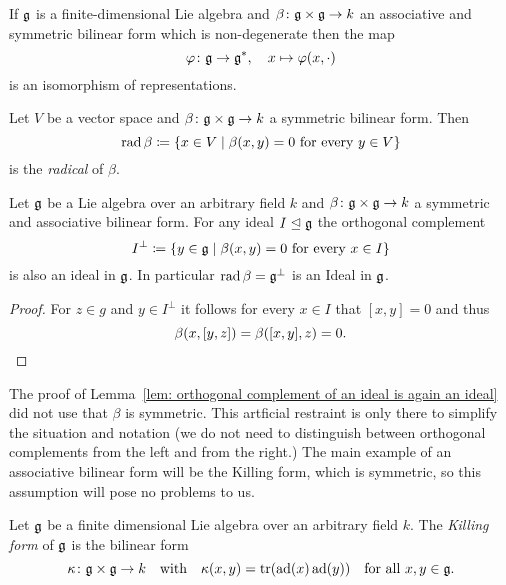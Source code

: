 \begin{cor}\label{cor: associative non-degenerate bilinear forms induce isomorphism to the dual}
 If $\mathfrak{g}$ is a finite-dimensional Lie algebra and $\beta \colon \mathfrak{g} \times \mathfrak{g} \to k$ an associative and symmetric bilinear form which is non-degenerate then the map
 \[
  \varphi \colon \mathfrak{g} \to \mathfrak{g}^*, \quad x \mapsto \varphi(x,\cdot)
 \]
 is an isomorphism of representations.
\end{cor}


\begin{defi}
 Let $V$ be a vector space and $\beta \colon \mathfrak{g} \times \mathfrak{g} \to k$ a symmetric bilinear form. Then
 \[
  \operatorname{rad} \beta \coloneqq \{x \in V \mid \text{$\beta(x,y) = 0$ for every $y \in V$}\}
 \]
 is the \emph{radical} of $\beta$.
\end{defi}


\begin{lem}\label{lem: orthogonal complement of an ideal is again an ideal}
 Let $\mathfrak{g}$ be a Lie algebra over an arbitrary field $k$ and \mbox{$\beta \colon \mathfrak{g} \times \mathfrak{g} \to k$} a symmetric and associative bilinear form. For any ideal $I \trianglelefteq \mathfrak{g}$ the orthogonal complement
 \[
  I^\perp \coloneqq \{y \in \mathfrak{g} \mid \text{$\beta(x,y) = 0$ for every $x \in I$}\}
 \]
 is also an ideal in $\mathfrak{g}$. In particular $\operatorname{rad} \beta = \mathfrak{g}^\perp$ is an Ideal in $\mathfrak{g}$.
\end{lem}
\begin{proof}
 For $z \in g$ and $y \in I^\perp$ it follows for every $x \in I$ that $[x,y] = 0$ and thus
 \[
  \beta(x,[y,z]) = \beta([x,y],z) = 0.
  \qedhere
 \]
\end{proof}


\begin{rem}
 The proof of Lemma~\ref{lem: orthogonal complement of an ideal is again an ideal} did not use that $\beta$ is symmetric. This artficial restraint is only there to simplify the situation and notation (we do not need to distinguish between orthogonal complements from the left and from the right.) The main example of an associative bilinear form will be the Killing form, which is symmetric, so this assumption will pose no problems to us.
\end{rem}


\begin{defi}
 Let $\mathfrak{g}$ be a finite dimensional Lie algebra over an arbitrary field $k$. The \emph{Killing form} of $\mathfrak{g}$ is the bilinear form
 \[
  \kappa \colon \mathfrak{g} \times \mathfrak{g} \to k
  \quad\text{with}\quad
  \kappa(x,y) = \operatorname{tr}(\operatorname{ad}(x) \operatorname{ad}(y))
  \quad\text{for all $x,y \in \mathfrak{g}$}.
 \]
\end{defi}


